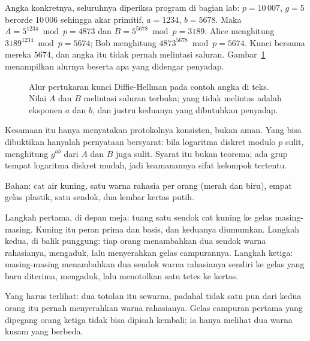 Angka konkretnya, seluruhnya diperiksa program di bagian lab: $p=10\,007$, $g=5$ berorde
$10\,006$ sehingga akar primitif, $a=1234$, $b=5678$. Maka $A=5^{1234}\bmod p=4873$ dan
$B=5^{5678}\bmod p=3189$. Alice menghitung $3189^{1234}\bmod p=5674$; Bob menghitung
$4873^{5678}\bmod p=5674$. Kunci bersama mereka $5674$, dan angka itu tidak pernah melintasi
saluran. Gambar~\ref{fig:dh} menampilkan alurnya beserta apa yang didengar penyadap.

\begin{figure}[htbp]
\centering
{}
\caption{Alur pertukaran kunci Diffie-Hellman pada contoh angka di teks. Nilai $A$ dan $B$
melintasi saluran terbuka; yang tidak melintas adalah eksponen $a$ dan $b$, dan justru
keduanya yang dibutuhkan penyadap.}
\label{fig:dh}
\end{figure}

Kesamaan itu hanya menyatakan protokolnya konsisten, bukan aman. Yang bisa dibuktikan hanyalah
pernyataan bersyarat: bila logaritma diskret modulo $p$ sulit, menghitung $g^{ab}$ dari $A$
dan $B$ juga sulit. Syarat itu bukan teorema; ada grup tempat logaritma diskret mudah, jadi
keamanannya sifat kelompok tertentu.

\begin{tangan}
Bahan: cat air kuning, satu warna rahasia per orang (merah dan biru), empat gelas plastik,
satu sendok, dua lembar kertas putih.

Langkah pertama, di depan meja: tuang satu sendok cat kuning ke gelas masing-masing. Kuning itu
peran prima dan basis, dan keduanya diumumkan. Langkah kedua, di balik punggung: tiap orang
menambahkan dua sendok warna rahasianya, mengaduk, lalu menyerahkan gelas campurannya. Langkah
ketiga: masing-masing menambahkan dua sendok warna rahasianya sendiri ke gelas yang baru
diterima, mengaduk, lalu menotolkan satu tetes ke kertas.

Yang harus terlihat: dua totolan itu sewarna, padahal tidak satu pun dari kedua orang itu
pernah menyerahkan warna rahasianya. Gelas campuran pertama yang dipegang orang ketiga tidak
bisa dipisah kembali; ia hanya melihat dua warna kusam yang berbeda.
\end{tangan}

